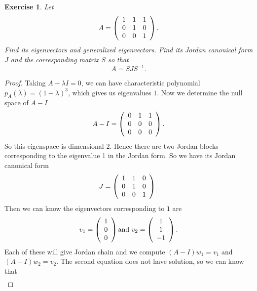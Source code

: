 \documentclass[11pt]{book}
\newtheorem{exercise}{Exercise}[section]
\theoremstyle{definition}
\numberwithin{equation}{chapter}
\begin{document}
\medskip

\begin{exercise}
Let%
$$
A=\left(
\begin{array}
[c]{ccc}%
1 & 1 & 1\\
0 & 1 & 0\\
0 & 0 & 1
\end{array}
\right)  .
$$
Find its eigenvectors and generalized eigenvectors. Find its Jordan canonical
form $J$ and the corresponding matrix $S$ so that%
$$
A=SJS^{-1}\text{.}%
$$
\end{exercise}
\begin{proof}
Taking $A-\lambda I = 0$, we can have characteristic polynomial $p_A(\lambda) = (1-\lambda)^3$, which gives us eigenvalues $1$. Now we determine the null space of $A - I$
\begin{align*}
    A-I =\left(\begin{array}
    [c]{ccc}%
    0 & 1 & 1\\
    0 & 0 & 0\\
    0 & 0 & 0
    \end{array}\right).
\end{align*}
So this eigenspace is dimensional-$2$. Hence there are two Jordan blocks corresponding to the eigenvalue 1 in the Jordan form. So we have its Jordan canonical form
\begin{align*}
    J = \left(\begin{array}
    [c]{ccc}%
    1 & 1 & 0\\
    0 & 1 & 0\\
    0 & 0 & 1
    \end{array}\right).
\end{align*}
Then we can know the eigenvectors corresponding to $1$ are 
\begin{align*}
    v_1 = \left(\begin{array}
    [c]{c}%
    1 \\
    0 \\
    0 
    \end{array}\right) 
    \text{and}\,\,
    v_2 = \left(\begin{array}
    [c]{c}%
    1 \\
    1 \\
    -1 
    \end{array}\right).
\end{align*}
Each of these will give Jordan chain and we compute $(A-I)w_1 = v_1$ and $(A-I)w_2 = v_2$. The second equation does not have solution, so we can know that
\begin{align*}

\end{align*}
\end{proof}
\end{document}
